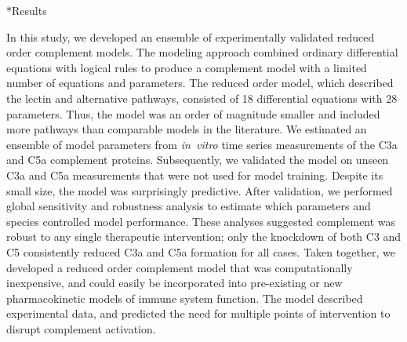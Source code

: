 \documentclass[12pt]{article}
\makeatletter
\renewcommand\section{\@startsection
	{subsection}{2}{0mm}
	{-0.2in}
	{0.05\baselineskip}
	{\normalfont\large\bfseries}}
\makeatother
\begin{document}
\clearpage

\section*{Results}

In this study, we developed an ensemble of experimentally validated reduced order complement models.
The modeling approach combined ordinary differential equations with logical rules to produce a complement model with a limited number of equations and parameters.
The reduced order model,  which described the lectin and alternative pathways, consisted of 18 differential equations with 28 parameters.
Thus, the model was an order of magnitude smaller and included more pathways than comparable models in the literature.
We estimated an ensemble of model parameters from \textit{in~vitro} time series measurements of the C3a and C5a complement proteins.
Subsequently, we validated the model on unseen C3a and C5a measurements that were not used for model training.
Despite its small size, the model was surprisingly predictive.
After validation, we performed global sensitivity and robustness analysis to estimate which parameters and species
controlled model performance. These analyses suggested complement was robust to any single therapeutic intervention;
only the knockdown of both C3 and C5 consistently reduced C3a and C5a formation for all cases.
Taken together, we developed a reduced order complement model that was computationally inexpensive,
and could easily be incorporated into pre-existing or new pharmacokinetic models of immune system function.
The model described experimental data, and predicted the need for multiple points of intervention to disrupt complement activation.
\end{document}
